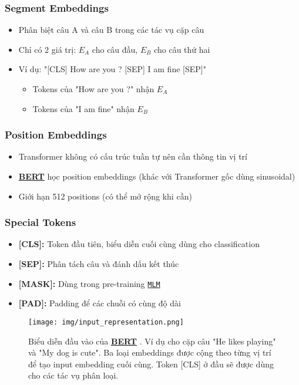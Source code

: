 \subsubsection{Segment Embeddings}  
\begin{itemize}
    \item Phân biệt câu A và câu B trong các tác vụ cặp câu
    \item Chỉ có 2 giá trị: $E_A$ cho câu đầu, $E_B$ cho câu thứ hai
    \item Ví dụ: "[CLS] How are you ?
    [SEP] I am fine [SEP]"
    \begin{itemize}
        \item Tokens của "How are you ?" nhận $E_A$
        \item Tokens của "I am fine" nhận $E_B$
    \end{itemize}
\end{itemize}

\subsubsection{Position Embeddings}
\begin{itemize}
    \item Transformer không có cấu trúc tuần tự nên cần thông tin vị trí
    \item \hyperref[acro:bert]{\textbf{BERT}} học position embeddings (khác với Transformer gốc dùng sinusoidal)
    \item Giới hạn 512 positions (có thể mở rộng khi cần)
\end{itemize}

\subsubsection{Special Tokens}
\begin{itemize}
    \item \textbf{[CLS]:} Token đầu tiên, biểu
    diễn cuối cùng dùng cho classification
    \item \textbf{[SEP]:} Phân tách câu và đánh dấu kết thúc
    \item \textbf{[MASK]:} Dùng trong pre-training \hyperref[acro:mlm]{\texttt{MLM}}
    \item \textbf{[PAD]:} Padding để các chuỗi có cùng độ dài
\end{itemize}

\begin{figure}[H]
    \centering
    \texttt{[image: img/input\_representation.png]}
    \caption{Biểu diễn đầu vào của \hyperref[acro:bert]{\textbf{BERT}} \cite{devlin2018bert}. Ví dụ cho cặp câu "He likes playing" và "My dog is cute".
    Ba loại embeddings được cộng theo từng vị trí để tạo input embedding cuối cùng.
    Token [CLS] ở đầu sẽ được dùng cho các tác vụ phân loại.}
    \label{fig:bert_input_representation}
\end{figure}

